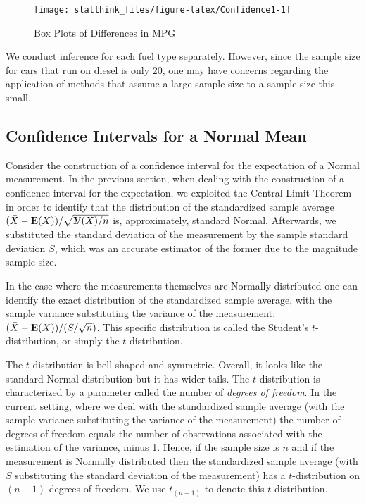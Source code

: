 \documentclass[]{krantz}
\newcommand{\Expec}{{\rm I\kern-.3em E}}
\newcommand{\Var}{{\rm I\kern-.3em V}}
\theoremstyle{definition}
\theoremstyle{definition}
\theoremstyle{definition}
\theoremstyle{remark}
\begin{document}
\begin{figure}

{\centering \texttt{[image: statthink\_files/figure-latex/Confidence1-1]} 

}

\caption{Box Plots of Differences in MPG}\label{fig:Confidence1}
\end{figure}

We conduct inference for each fuel type separately. However, since the
sample size for cars that run on diesel is only 20, one may have
concerns regarding the application of methods that assume a large sample
size to a sample size this small.

\subsection{Confidence Intervals for a Normal
Mean}\label{confidence-intervals-for-a-normal-mean}

Consider the construction of a confidence interval for the expectation
of a Normal measurement. In the previous section, when dealing with the
construction of a confidence interval for the expectation, we exploited
the Central Limit Theorem in order to identify that the distribution of
the standardized sample average
\((\bar X - \Expec(X))/\sqrt{\Var(X)/n}\) is, approximately, standard
Normal. Afterwards, we substituted the standard deviation of the
measurement by the sample standard deviation \(S\), which was an
accurate estimator of the former due to the magnitude sample size.

In the case where the measurements themselves are Normally distributed
one can identify the exact distribution of the standardized sample
average, with the sample variance substituting the variance of the
measurement: \((\bar X - \Expec(X))/(S/\sqrt{n})\). This specific
distribution is called the Student's \(t\)-distribution, or simply the
\(t\)-distribution.

The \(t\)-distribution is bell shaped and symmetric. Overall, it looks
like the standard Normal distribution but it has wider tails. The
\(t\)-distribution is characterized by a parameter called the number of
\emph{degrees of freedom}. In the current setting, where we deal with
the standardized sample average (with the sample variance substituting
the variance of the measurement) the number of degrees of freedom equals
the number of observations associated with the estimation of the
variance, minus 1. Hence, if the sample size is \(n\) and if the
measurement is Normally distributed then the standardized sample average
(with \(S\) substituting the standard deviation of the measurement) has
a \(t\)-distribution on \((n-1)\) degrees of freedom. We use
\(t_{(n-1)}\) to denote this \(t\)-distribution.
\end{document}
